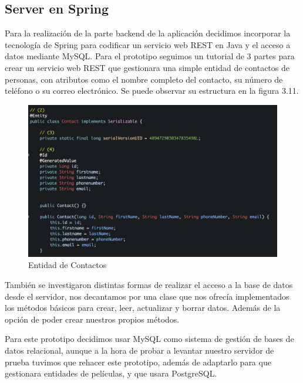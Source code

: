 \subsection{Server en Spring} 
\label{makereference3.6.6}

Para la realización de la parte backend de la aplicación decidimos
incorporar la tecnología de Spring para codificar un servicio web REST en Java
y el acceso a datos mediante MySQL. Para el prototipo seguimos un tutorial\cite{tutorialspring} de 3 partes para crear un servicio web REST
que gestionara una simple entidad de contactos de personas, con atributos como el nombre completo del contacto, su número de teléfono o su correo electrónico. Se puede observar su estructura
en la figura 3.11.
    \begin{figure}[H]
        \centering
        \includegraphics[width=6in]{figures/ContactsEntity.png}
        \caption{Entidad de Contactos}
    \end{figure}

También se investigaron distintas formas de realizar el acceso a la base de datos desde el servidor, nos decantamos por una clase que nos ofrecía implementados los métodos básicos para crear, leer, actualizar y borrar datos. Además de la opción 
de poder crear nuestros propios métodos.

Para este prototipo decidimos usar MySQL como sistema de gestión de bases de datos relacional, aunque
a la hora de probar a levantar nuestro servidor de prueba tuvimos que rehacer este prototipo, además de adaptarlo para 
que gestionara entidades de películas, y que usara PostgreSQL.
